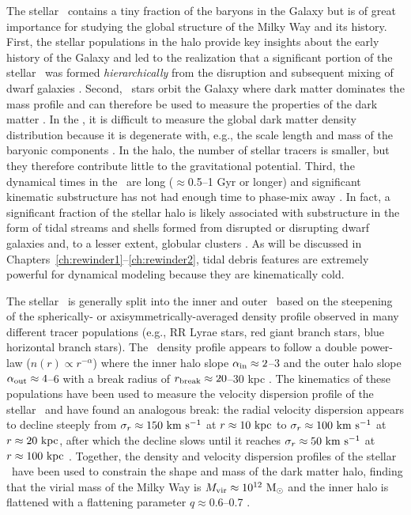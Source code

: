 The stellar \mwhalo\ contains a tiny fraction of the baryons in the Galaxy
\citep[$\approx$1\%;][]{bell08} but is of great importance for studying the
global structure of the Milky Way and its history. First, the stellar
populations in the halo provide key insights about the early history of the
Galaxy and led to the realization that a significant portion of the stellar
\mwhalo\ was formed \emph{hierarchically} from the disruption and subsequent
mixing of dwarf galaxies \citep[e.g.,][]{searle78, bullock05, bell08}. Second,
\mwhalo\ stars orbit the Galaxy where dark matter dominates the mass profile and
can therefore be used to measure the properties of the dark matter \mwhalo. In
the \mwdisk, it is difficult to measure the global dark matter density
distribution because it is degenerate with, e.g., the scale length and mass of
the baryonic components \citep{dehnen98a,sofue09}. In the halo, the number of
stellar tracers is smaller, but they therefore contribute little to the
gravitational potential. Third, the dynamical times in the \mwhalo\ are long
($\approx$0.5--1 Gyr or longer) and significant kinematic substructure has not
had enough time to phase-mix away \citep{helmi99}. In fact, a significant
fraction \citep[$\approx$40--50\%;][]{bell08} of the stellar halo is likely
associated with substructure in the form of tidal streams and shells formed from
disrupted or disrupting dwarf galaxies and, to a lesser extent, globular
clusters \citep[e.g.,][]{newberg02,majewski03,belokurov06}. As will be discussed
in Chapters~\ref{ch:rewinder1}--\ref{ch:rewinder2}, tidal debris features are
extremely powerful for dynamical modeling because they are kinematically cold.

The stellar \mwhalo\ is generally split into the inner and outer \mwhalo\ based
on the steepening of the spherically- or axisymmetrically-averaged density
profile observed in many different tracer populations (e.g., RR Lyrae stars, red
giant branch stars, blue horizontal branch stars). The \mwhalo\ density profile
appears to follow a double power-law ($n(r) \propto r^{-\alpha}$) where the
inner halo slope $\alpha_{\rm in} \approx 2$--3 and the outer halo slope
$\alpha_{\rm out} \approx 4$--6 with a break radius of $r_{\rm break} \approx
20$--30 kpc \citep{watkins09, sesar10, deason11, sesar11, sesar13a}. The
kinematics of these populations have been used to measure the velocity
dispersion profile of the stellar \mwhalo\ and have found an analogous
break: the radial velocity dispersion appears to decline steeply from
$\sigma_r \approx 150~\mathrm{km}~\mathrm{s}^{-1}$ at $r\approx10~\mathrm{kpc}$ to $\sigma_r \approx 100~\mathrm{km}~\mathrm{s}^{-1}$
at $r\approx20~\mathrm{kpc}$, after which the decline slows until it reaches $\sigma_r
\approx 50~\mathrm{km}~\mathrm{s}^{-1}$ at $r\approx100~\mathrm{kpc}$ \citep{battaglia05, xue08, brown10,
deason12b, deason13}. Together, the density and velocity dispersion profiles of
the stellar \mwhalo\ have been used to constrain the shape and mass of the dark
matter halo, finding that the virial mass of the Milky Way is $M_{\rm vir}
\approx 10^{12}~\mathrm{M}_\odot$ and the inner halo is flattened with a flattening
parameter $q \approx 0.6$--0.7 \citep{sesar11, deason11, sesar13a, xue15}.

